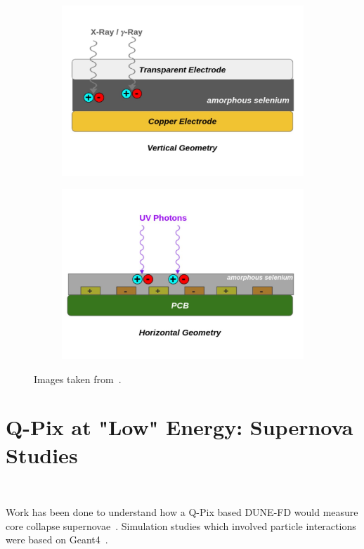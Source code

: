 \begin{figure}
\centering
\begin{subfigure}{.5\textwidth}
  \centering
  \includegraphics[width=\textwidth]{images/qpix_light_vertical_geom.pdf}
  \caption{}
\end{subfigure}%
\begin{subfigure}{.5\textwidth}
  \centering
  \includegraphics[width=\textwidth]{images/qpix_light_horizontal_geom.pdf}
  \caption{}
\end{subfigure}
\caption{Images taken from~\citep{https://doi.org/10.48550/arxiv.2207.11127}.}
\label{fig:qpix_light_geometries}
\end{figure}

\section{Q-Pix at "Low" Energy: Supernova Studies}~\label{sec:supernova}

Work has been done to understand how a Q-Pix based DUNE-FD would measure core collapse supernovae~\citep{qpix:shion}.
Simulation studies which involved particle interactions were based on Geant4~\citep{geant4:AGOSTINELLI2003250}.


